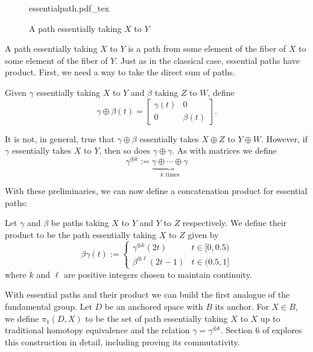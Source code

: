 \begin{figure}[h!]
\centering
  \def\svgwidth{0.9\columnwidth}
  {essentialpath.pdf_tex}
\caption{A path essentially taking \(X\) to \(Y\)}
\label{fig:esspath}
\end{figure}
A path essentially taking \(X\) to \(Y\) is a path from some element of the
fiber of \(X\) to some element of the fiber of \(Y\). Just as in the classical
case, essential paths have product. First, we need a way to take the direct sum
of paths.

\begin{definition}%
  Given \(\gamma\) essentially taking \(X\) to \(Y\) and \(\beta\) taking \(Z\)
  to \(W\), define
  \[
    \gamma\oplus\beta(t) = \begin{bmatrix} \gamma(t)&0\\0&\beta(t) \end{bmatrix}.
  \]
\end{definition}

It is not, in general, true that \(\gamma\oplus\beta\) essentially takes
\(X\oplus Z\) to \(Y \oplus W\). However, if \(\gamma\) essentially takes \(X\)
to \(Y\), then so does \(\gamma\oplus\gamma\). As with matrices we define
\[
  \gamma^{\oplus k} := \underbrace{\gamma\oplus \cdots \oplus\gamma}_{k \text{ times}}
\]

With these preliminaries, we can now define a concatenation product for
essential paths:
\begin{definition}%
\label{def:concatprod}
  Let \(\gamma\) and \(\beta\) be paths taking \(X\) to \(Y\) and \(Y\) to \(Z\)
  respectively. We define their product to be the path essentially taking \(X\)
  to \(Z\) given by
  \[
    \beta\gamma(t) :=
    \begin{cases}
      \gamma^{\oplus k}(2t) & t \in [0,0.5) \\
      \beta^{\oplus\ell} (2t-1)& t \in (0.5,1]
    \end{cases}
  \]
  where \(k\) and \(\ell\) are positive integers chosen to maintain continuity.
\end{definition}

With essential paths and their product we can build the first analogue of the
fundamental group. Let \(D\) be an anchored space with \(B\) its anchor. For
\(X \in B\), we define \(\pi_1(D,X)\) to be the set of path essentially taking
\(X\) to \(X\) up to traditional homotopy equivalence and the relation
\(\gamma=\gamma^{\oplus k}\). Section 6 of
\cite{pascoeFreeNoncommutativePrincipal2020} explores this construction in
detail, including proving its commutativity.

